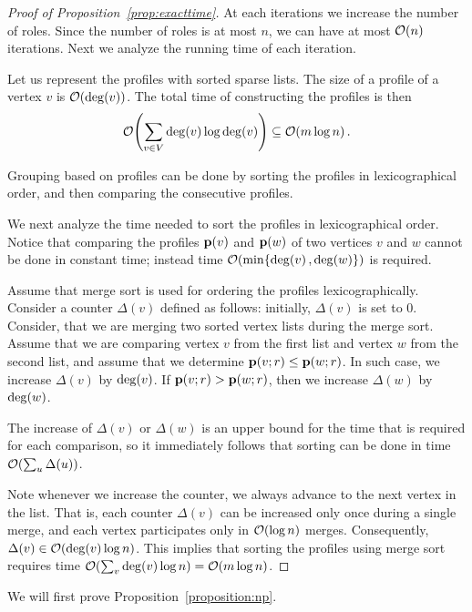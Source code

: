 
\begin{proof}[Proof of Proposition~\ref{prop:exacttime}]
At each iterations we increase the number of roles. Since the number of roles
is at most $n$, we can have at most $\bigO{n}$ iterations.
Next we analyze the running time of each iteration.

Let us represent the profiles with sorted sparse lists. The size of a profile
of a vertex $v$ is $\bigO{\dg{v}}$. The total time of constructing the profiles is
then
\[
	\bigO{\sum_{v \in V} \dg{v} \log \dg{v}} \subseteq \bigO{m \log n}.
\]

Grouping based on profiles can be done by sorting the profiles in
lexicographical order, and then comparing the consecutive profiles.

We next analyze the time needed to sort the profiles in lexicographical order.
Notice that comparing the profiles  $\prof{v}$ and $\prof{w}$ of two vertices $v$ and $w$
cannot be done in constant time;
instead time $\bigO{\min\{\dg{v}, \dg{w}\}}$ is required.

Assume that merge sort is used for ordering the profiles lexicographically.
Consider a counter $\Delta(v)$ defined as follows:
initially, $\Delta(v)$ is set to $0$.
Consider, that we are merging two sorted vertex lists during the merge sort.
Assume that we are comparing vertex $v$ from the first list and vertex $w$ from the second list,
and assume that we determine $\prof{v; \role} \leq \prof{w; \role}$.
In such case, we increase $\Delta(v)$ by $\dg{v}$.
If $\prof{v; \role} > \prof{w; \role}$, then we increase $\Delta(w)$ by $\dg{w}$.

The increase of $\Delta(v)$ or $\Delta(w)$ is an upper bound for the
time that is required for each comparison, so
it immediately follows that sorting can be done in time $\bigO{\sum_u \Delta(u)}$.

Note whenever we increase the counter, we always advance to the next vertex in
the list. That is,
each counter $\Delta(v)$ can be increased only once during a single merge,
and each vertex participates only in $\bigO{\log n}$ merges.
Consequently, $\Delta(v) \in \bigO{\dg{v} \log n}$.
This implies that sorting the profiles using  merge sort requires time
$\bigO{\sum_v \dg{v} \log n} = \bigO{m \log n}$.
\end{proof}



We will first prove Proposition~\ref{proposition:np}.

